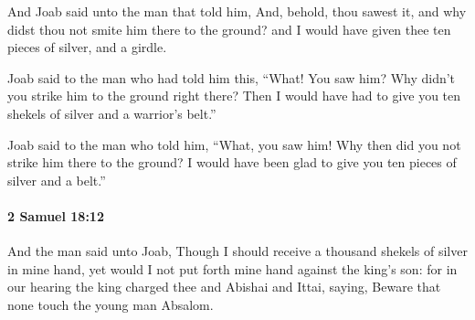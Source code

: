			\begin{versebox}
					\item[BHS] 
					\item[ASV] And Joab said unto the man that told him, And, behold, thou sawest it, and why didst thou not smite him there to the ground? and I would have given thee ten pieces of silver, and a girdle.
					\item[NIV] Joab said to the man who had told him this, “What! You saw him? Why didn’t you strike him to the ground right there? Then I would have had to give you ten shekels of silver and a warrior’s belt.”
					\item[NRSV] Joab said to the man who told him, “What, you saw him! Why then did you not strike him there to the ground? I would have been glad to give you ten pieces of silver and a belt.”
			\end{versebox}

		\paragraph{2 Samuel 18:12} %
			\label{2SAMUEL-18-12}

			And the man said unto Joab, Though I should receive a thousand shekels of silver in mine hand, yet would I not put forth mine hand against the king’s son: for in our hearing the king charged thee and Abishai and Ittai, saying, Beware that none touch the young man Absalom.

